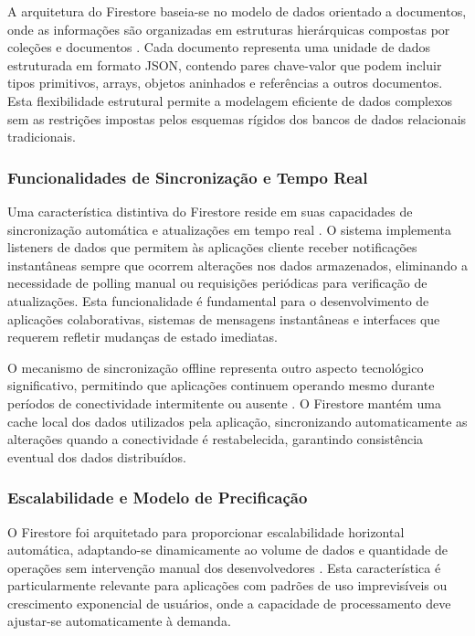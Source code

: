\documentclass[
	12pt,				    %
	openright,			    %
	oneside,			    %
	a4paper,			    %
    sumario=tradicional,    %
	english,			    %
	brazil,				    %
	]{abntex2}              %
\begin{document}
A arquitetura do Firestore baseia-se no modelo de dados orientado a documentos, onde as informações são organizadas em estruturas hierárquicas compostas por coleções e documentos \cite{mongodb2023nosql}. Cada documento representa uma unidade de dados estruturada em formato JSON, contendo pares chave-valor que podem incluir tipos primitivos, arrays, objetos aninhados e referências a outros documentos. Esta flexibilidade estrutural permite a modelagem eficiente de dados complexos sem as restrições impostas pelos esquemas rígidos dos bancos de dados relacionais tradicionais.

\subsubsection{Funcionalidades de Sincronização e Tempo Real}

Uma característica distintiva do Firestore reside em suas capacidades de sincronização automática e atualizações em tempo real \cite{firebase2023realtime}. O sistema implementa listeners de dados que permitem às aplicações cliente receber notificações instantâneas sempre que ocorrem alterações nos dados armazenados, eliminando a necessidade de polling manual ou requisições periódicas para verificação de atualizações. Esta funcionalidade é fundamental para o desenvolvimento de aplicações colaborativas, sistemas de mensagens instantâneas e interfaces que requerem refletir mudanças de estado imediatas.

O mecanismo de sincronização offline representa outro aspecto tecnológico significativo, permitindo que aplicações continuem operando mesmo durante períodos de conectividade intermitente ou ausente \cite{terry2013replicated}. O Firestore mantém uma cache local dos dados utilizados pela aplicação, sincronizando automaticamente as alterações quando a conectividade é restabelecida, garantindo consistência eventual dos dados distribuídos.

\subsubsection{Escalabilidade e Modelo de Precificação}

O Firestore foi arquitetado para proporcionar escalabilidade horizontal automática, adaptando-se dinamicamente ao volume de dados e quantidade de operações sem intervenção manual dos desenvolvedores \cite{google2023scalability}. Esta característica é particularmente relevante para aplicações com padrões de uso imprevisíveis ou crescimento exponencial de usuários, onde a capacidade de processamento deve ajustar-se automaticamente à demanda.
\end{document}
